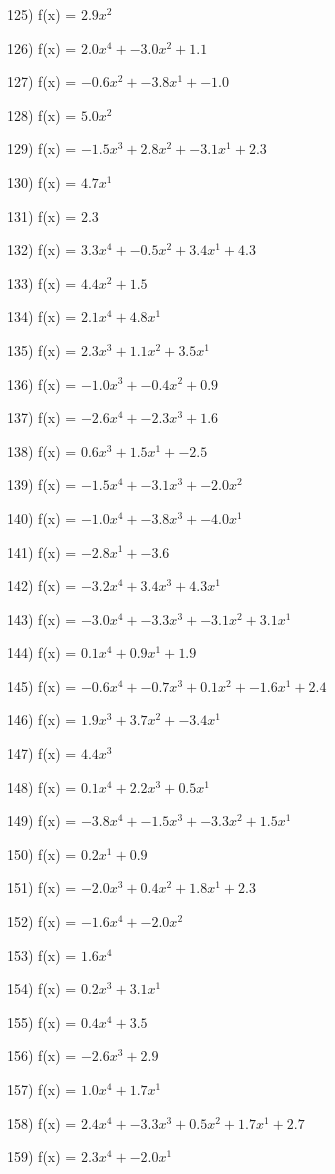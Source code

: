 \documentclass[10pt,a4paper]{article}
\begin{document}
125) f(x) = $2.9x^2$

126) f(x) = $2.0x^4 + -3.0x^2 + 1.1$

127) f(x) = $-0.6x^2 + -3.8x^1 + -1.0$

128) f(x) = $5.0x^2$

129) f(x) = $-1.5x^3 + 2.8x^2 + -3.1x^1 + 2.3$

130) f(x) = $4.7x^1$

131) f(x) = $2.3$

132) f(x) = $3.3x^4 + -0.5x^2 + 3.4x^1 + 4.3$

133) f(x) = $4.4x^2 + 1.5$

134) f(x) = $2.1x^4 + 4.8x^1$

135) f(x) = $2.3x^3 + 1.1x^2 + 3.5x^1$

136) f(x) = $-1.0x^3 + -0.4x^2 + 0.9$

137) f(x) = $-2.6x^4 + -2.3x^3 + 1.6$

138) f(x) = $0.6x^3 + 1.5x^1 + -2.5$

139) f(x) = $-1.5x^4 + -3.1x^3 + -2.0x^2$

140) f(x) = $-1.0x^4 + -3.8x^3 + -4.0x^1$

141) f(x) = $-2.8x^1 + -3.6$

142) f(x) = $-3.2x^4 + 3.4x^3 + 4.3x^1$

143) f(x) = $-3.0x^4 + -3.3x^3 + -3.1x^2 + 3.1x^1$

144) f(x) = $0.1x^4 + 0.9x^1 + 1.9$

145) f(x) = $-0.6x^4 + -0.7x^3 + 0.1x^2 + -1.6x^1 + 2.4$

146) f(x) = $1.9x^3 + 3.7x^2 + -3.4x^1$

147) f(x) = $4.4x^3$

148) f(x) = $0.1x^4 + 2.2x^3 + 0.5x^1$

149) f(x) = $-3.8x^4 + -1.5x^3 + -3.3x^2 + 1.5x^1$

150) f(x) = $0.2x^1 + 0.9$

151) f(x) = $-2.0x^3 + 0.4x^2 + 1.8x^1 + 2.3$

152) f(x) = $-1.6x^4 + -2.0x^2$

153) f(x) = $1.6x^4$

154) f(x) = $0.2x^3 + 3.1x^1$

155) f(x) = $0.4x^4 + 3.5$

156) f(x) = $-2.6x^3 + 2.9$

157) f(x) = $1.0x^4 + 1.7x^1$

158) f(x) = $2.4x^4 + -3.3x^3 + 0.5x^2 + 1.7x^1 + 2.7$

159) f(x) = $2.3x^4 + -2.0x^1$
\end{document}

